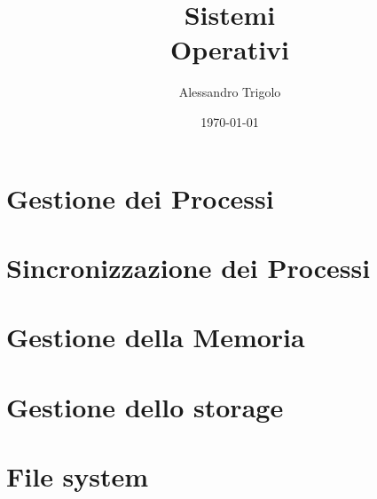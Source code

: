 \documentclass[titlepage]{article}
\title{\textbf{\fontsize{35pt}{35pt}\selectfont Sistemi\\\vspace{25pt}Operativi}}
\author{Alessandro Trigolo}
\date{\today}
\begin{document}
\maketitle

\newpage\tableofcontents

\newpage\listoffigures

\newpage\lstlistoflistings


\lstset{style = C++}





\newpage\part{Gestione dei Processi}











\newpage\part{Sincronizzazione dei Processi}









\newpage\part{Gestione della Memoria}









\newpage\part{Gestione dello storage}









\newpage\part{File system}


\end{document}
